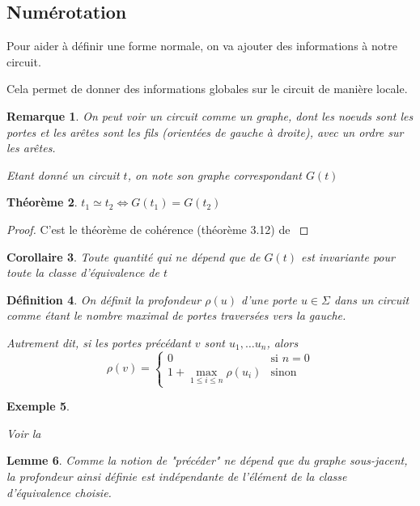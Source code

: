 \documentclass[12pt, a4paper]{article}
\newtheorem{definition}{Définition}[subsection]
\newtheorem{theorem}[definition]{Théorème}
\newtheorem{corollary}[definition]{Corollaire}
\newtheorem{lemma}[definition]{Lemme}
\newtheorem{remark}[definition]{Remarque}
\newtheorem{example}[definition]{Exemple}
\def\leqv{\Longleftrightarrow}
\begin{document}
\subsection{Numérotation}

Pour aider à définir une forme normale, on va ajouter des informations à notre circuit.

Cela permet de donner des informations globales sur le circuit de manière locale.

\begin{remark}
    On peut voir un circuit comme un graphe, dont les noeuds sont les portes et les arêtes sont les fils (orientées de gauche à droite), avec un ordre sur les arêtes.

    Etant donné un circuit $t$, on note son graphe correspondant $G(t)$
\end{remark}

\begin{theorem}
    $t_1 \simeq t_2 \leqv G(t_1) = G(t_2)$
\end{theorem}
\begin{proof}
    C'est le théorème de cohérence (théorème 3.12) de \cite{monoidalcat}
\end{proof}

\begin{corollary}
    Toute quantité qui ne dépend que de $G(t)$ est invariante pour toute la classe d'équivalence de $t$
\end{corollary}

\begin{definition}
    On définit la profondeur $\rho(u)$ d'une porte $u \in \Sigma$ dans un circuit comme étant le nombre maximal de portes traversées vers la gauche.

    Autrement dit, si les portes précédant $v$ sont $u_1, \ldots u_n$, alors
    \[ \rho(v) = \begin{cases}
        0 & \text{si } n=0\\
        1+\max_{1\le i\le n} \rho(u_i) & \text{sinon}
    \end{cases} \]
\end{definition}

\begin{example}
    \label{ex:depth}

    Voir la \hyperref[ann:depth]{}
\end{example}

\begin{lemma}
    Comme la notion de "précéder" ne dépend que du graphe sous-jacent, la profondeur ainsi définie est indépendante de l'élément de la classe d'équivalence choisie.
\end{lemma}
\end{document}
